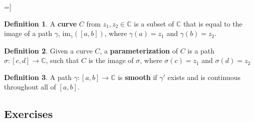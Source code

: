 =]\documentclass{article}
\theoremstyle{definition}
\newtheorem{definition}{Definition}[section]
\theoremstyle{remark}
\theoremstyle{definition}
\begin{document}
\begin{definition}
    A \textbf{curve} $C$ from $z_1,z_2\in\mathbb{C}$ is a subset of $\mathbb{C}$ that is equal to the image of a path $\gamma$, im$_{\gamma}([a,b])$, where $\gamma(a)=z_1$ and $\gamma(b)=z_2$.
\end{definition}

\begin{definition}
    Given a curve $C$, a \textbf{parameterization} of $C$ is a path $\sigma\colon[c,d]\rightarrow \mathbb{C}$, such that $C$ is the image of $\sigma$, where $\sigma(c)=z_1$ and $\sigma(d)=z_2$
\end{definition}

\begin{definition}
    A path $\gamma\colon[a,b]\rightarrow\mathbb{C}$ is \textbf{smooth} if $\gamma'$ exists and is continuous throughout all of $[a,b]$.
\end{definition}

\newpage

\subsection{Exercises}
\end{document}
